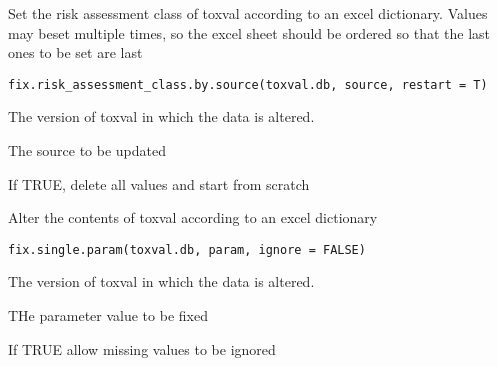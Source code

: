 \documentclass[letterpaper]{book}
\begin{document}
%
\begin{Description}\relax
Set the risk assessment class of toxval according to an excel dictionary.
Values may beset multiple times, so the excel sheet should be ordered so that
the last ones to be set are last
\end{Description}
%
\begin{Usage}
\begin{verbatim}
fix.risk_assessment_class.by.source(toxval.db, source, restart = T)
\end{verbatim}
\end{Usage}
%
\begin{Arguments}
\begin{ldescription}
\item[\code{toxval.db}] The version of toxval in which the data is altered.

\item[\code{source}] The source to be updated

\item[\code{restart}] If TRUE, delete all values and start from scratch
\end{ldescription}
\end{Arguments}
%
\begin{Description}\relax
Alter the contents of toxval according to an excel dictionary
\end{Description}
%
\begin{Usage}
\begin{verbatim}
fix.single.param(toxval.db, param, ignore = FALSE)
\end{verbatim}
\end{Usage}
%
\begin{Arguments}
\begin{ldescription}
\item[\code{toxval.db}] The version of toxval in which the data is altered.

\item[\code{param}] THe parameter value to be fixed

\item[\code{ignore}] If TRUE allow missing values to be ignored
\end{ldescription}
\end{Arguments}
\end{document}
